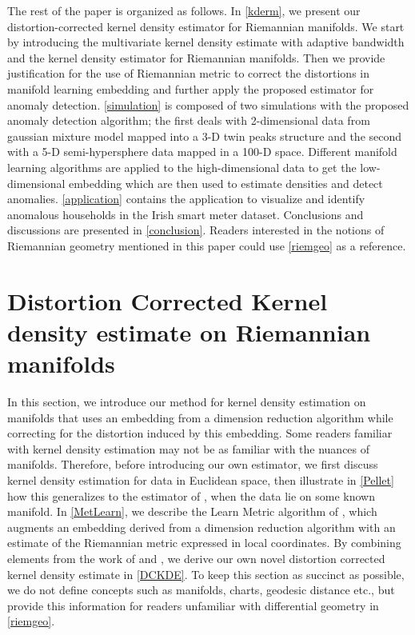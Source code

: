 \documentclass[11pt,a4paper,]{article}
\begin{document}
The rest of the paper is organized as follows. In \autoref{kderm}, we present our distortion-corrected kernel density estimator for Riemannian manifolds. We start by introducing the multivariate kernel density estimate with adaptive bandwidth and the kernel density estimator for Riemannian manifolds. Then we provide justification for the use of Riemannian metric to correct the distortions in manifold learning embedding and further apply the proposed estimator for anomaly detection. \autoref{simulation} is composed of two simulations with the proposed anomaly detection algorithm; the first deals with 2-dimensional data from gaussian mixture model mapped into a 3-D twin peaks structure and the second with a 5-D semi-hypersphere data mapped in a 100-D space. Different manifold learning algorithms are applied to the high-dimensional data to get the low-dimensional embedding which are then used to estimate densities and detect anomalies.
\autoref{application} contains the application to visualize and identify anomalous households in the Irish smart meter dataset. Conclusions and discussions are presented in \autoref{conclusion}. Readers interested in the notions of Riemannian geometry mentioned in this paper could use \autoref{riemgeo} as a reference.

\hypertarget{kderm}{%
\section{Distortion Corrected Kernel density estimate on Riemannian manifolds}\label{kderm}}

In this section, we introduce our method for kernel density estimation on manifolds that uses an embedding from a dimension reduction algorithm while correcting for the distortion induced by this embedding. Some readers familiar with kernel density estimation may not be as familiar with the nuances of manifolds. Therefore, before introducing our own estimator, we first discuss kernel density estimation for data in Euclidean space, then illustrate in \autoref{Pellet} how this generalizes to the estimator of \textcite{Pelletier2005-vu}, when the data lie on some known manifold. In \autoref{MetLearn}, we describe the Learn Metric algorithm of \textcite{Perrault-Joncas2013-pq}, which augments an embedding derived from a dimension reduction algorithm with an estimate of the Riemannian metric expressed in local coordinates. By combining elements from the work of \textcite{Pelletier2005-vu} and \textcite{Perrault-Joncas2013-pq}, we derive our own novel distortion corrected kernel density estimate in \autoref{DCKDE}. To keep this section as succinct as possible, we do not define concepts such as manifolds, charts, geodesic distance etc., but provide this information for readers unfamiliar with differential geometry in \autoref{riemgeo}.
\end{document}
